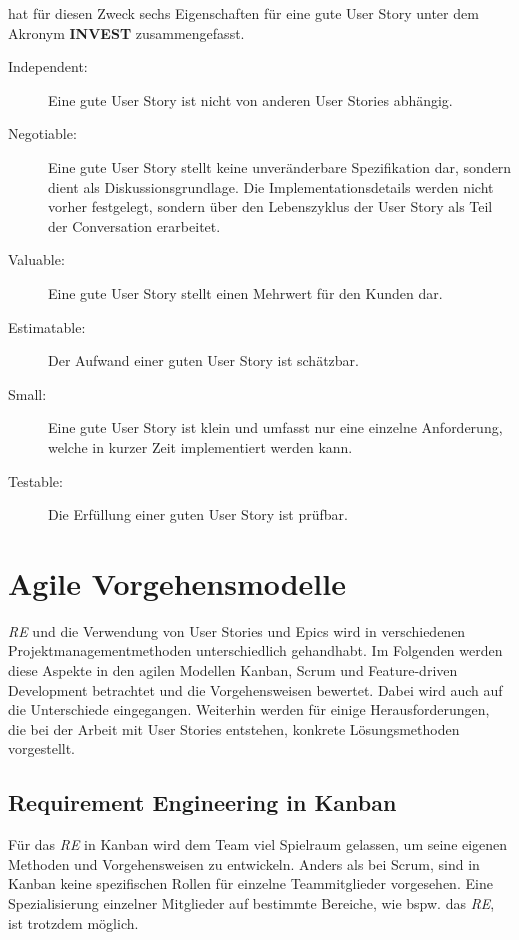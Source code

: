 \documentclass[acmtog]{acmart}
\begin{document}
\cite{wake_invest_2003} hat für diesen Zweck sechs Eigenschaften für eine gute User Story unter dem Akronym \textbf{INVEST} zusammengefasst.
\begin{description}
	\item[Independent:] Eine gute User Story ist nicht von anderen User Stories abhängig.
	\item[Negotiable:] Eine gute User Story stellt keine unveränderbare Spezifikation dar, sondern dient als Diskussionsgrundlage.
		Die Implementationsdetails werden nicht vorher festgelegt, sondern über den Lebenszyklus der User Story als Teil der Conversation
		erarbeitet.
	\item[Valuable:] Eine gute User Story stellt einen Mehrwert für den Kunden dar.
	\item[Estimatable:] Der Aufwand einer guten User Story ist schätzbar.
	\item[Small:] Eine gute User Story ist klein und umfasst nur eine einzelne Anforderung, welche in kurzer Zeit implementiert werden kann.
	\item[Testable:] Die Erfüllung einer guten User Story ist prüfbar.
\end{description}


\section{Agile Vorgehensmodelle} \label{sec:agile-vorgehensmodelle}

\emph{RE} und die Verwendung von User Stories und Epics wird in verschiedenen Projektmanagementmethoden unterschiedlich gehandhabt. Im Folgenden werden 
diese Aspekte in den agilen Modellen Kanban, Scrum und Feature-driven Development betrachtet und die Vorgehensweisen bewertet. Dabei wird auch auf die Unterschiede eingegangen. 
Weiterhin werden für einige Herausforderungen, die bei der Arbeit mit User Stories entstehen, konkrete Lösungsmethoden vorgestellt.

\subsection{Requirement Engineering in Kanban}

Für das \emph{RE} in Kanban wird dem Team viel Spielraum gelassen, 
um seine eigenen Methoden und Vorgehensweisen zu entwickeln. Anders als bei Scrum, sind 
in Kanban keine spezifischen Rollen für einzelne Teammitglieder vorgesehen. Eine 
Spezialisierung einzelner Mitglieder auf bestimmte Bereiche, wie bspw. das \emph{RE}, ist trotzdem 
möglich.
\end{document}
